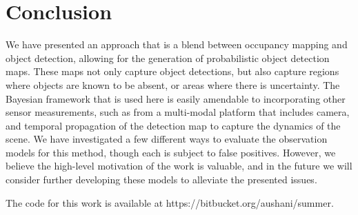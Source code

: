 \section{Conclusion}\label{sec:conclusion}

We have presented an approach that is a blend between occupancy mapping and
object detection, allowing for the generation of probabilistic object detection
maps. These maps not only capture object detections, but also capture regions
where objects are known to be absent, or areas where there is uncertainty. The
Bayesian framework that is used here is easily amendable to incorporating other
sensor measurements, such as from a multi-modal platform that includes camera,
and temporal propagation of the detection map to capture the dynamics of the
scene. We have investigated a few different ways to evaluate the observation
models for this method, though each is subject to false positives. However, we
believe the high-level motivation of the work is valuable, and in the future we
will consider further developing these models to alleviate the presented issues.

The code for this work is available at https://bitbucket.org/aushani/summer.
